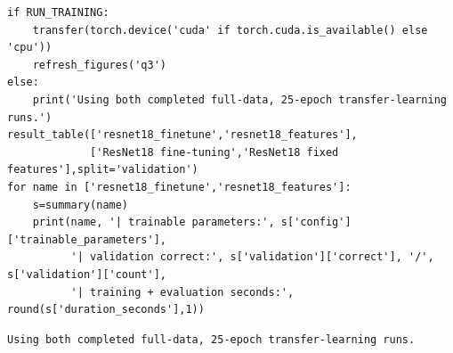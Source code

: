\documentclass[10pt,a4paper]{article}
\begin{document}
\par\noindent\begin{minipage}{\linewidth}
\begin{lstlisting}
if RUN_TRAINING:
    transfer(torch.device('cuda' if torch.cuda.is_available() else 'cpu'))
    refresh_figures('q3')
else:
    print('Using both completed full-data, 25-epoch transfer-learning runs.')
result_table(['resnet18_finetune','resnet18_features'],
             ['ResNet18 fine-tuning','ResNet18 fixed features'],split='validation')
for name in ['resnet18_finetune','resnet18_features']:
    s=summary(name)
    print(name, '| trainable parameters:', s['config']['trainable_parameters'],
          '| validation correct:', s['validation']['correct'], '/', s['validation']['count'],
          '| training + evaluation seconds:', round(s['duration_seconds'],1))
\end{lstlisting}
\end{minipage}\par

\par\noindent\begin{minipage}{\linewidth}
\begin{lstlisting}[language={}]
Using both completed full-data, 25-epoch transfer-learning runs.
\end{lstlisting}
\end{minipage}\par
\end{document}
